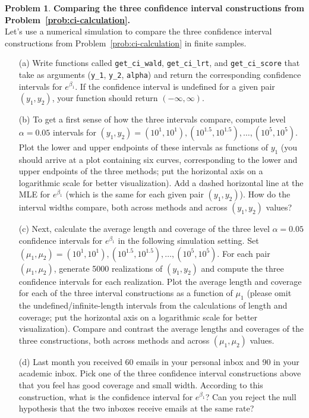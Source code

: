 \documentclass[11pt,letterpaper,english,oneside]{article} %
\theoremstyle{definition} %
\newtheorem{problem}{Problem}
\newenvironment{prob}{\clearpage \begin{problem}\hspace{0pt}}{\end{problem}}
\begin{document}
\begin{prob} \label{prob:ci-simulation}\textbf{Comparing the three confidence interval constructions from Problem~\ref{prob:ci-calculation}.} \\

    \noindent Let's use a numerical simulation to compare the three confidence interval constructions from Problem~\ref{prob:ci-calculation} in finite samples.
    
    \begin{enumerate}
    
    \item[(a)] Write functions called \verb|get_ci_wald|, \verb|get_ci_lrt|, and \verb|get_ci_score| that take as arguments (\verb|y_1|, \verb|y_2|, \verb|alpha|) and return the corresponding confidence intervals for $e^{\beta_1}$. If the confidence interval is undefined for a given pair $(y_1, y_2)$, your function should return $(-\infty, \infty)$.
    
    \item[(b)] To get a first sense of how the three intervals compare, compute level $\alpha = 0.05$ intervals for $(y_1, y_2) = (10^1, 10^1), (10^{1.5}, 10^{1.5}), \dots, (10^5, 10^5)$. Plot the lower and upper endpoints of these intervals as functions of $y_1$ (you should arrive at a plot containing six curves, corresponding to the lower and upper endpoints of the three methods; put the horizontal axis on a logarithmic scale for better visualization). Add a dashed horizontal line at the MLE for $e^{\beta_1}$ (which is the same for each given pair $(y_1, y_2)$). How do the interval widths compare, both across methods and across $(y_1, y_2)$ values?
    
    \item[(c)] Next, calculate the average length and coverage of the three level $\alpha = 0.05$ confidence intervals for $e^{\beta_1}$ in the following simulation setting. Set $(\mu_1, \mu_2) = (10^1, 10^1), (10^{1.5}, 10^{1.5}), \dots, (10^5, 10^5)$. For each pair $(\mu_1, \mu_2)$, generate 5000 realizations of $(y_1, y_2)$ and compute the three confidence intervals for each realization. Plot the average length and coverage for each of the three interval constructions as a function of $\mu_1$ (please omit the undefined/infinite-length intervals from the calculations of length and coverage; put the horizontal axis on a logarithmic scale for better visualization). Compare and contrast the average lengths and coverages of the three constructions, both across methods and across $(\mu_1, \mu_2)$ values.
    
    \item[(d)] Last month you received 60 emails in your personal inbox and 90 in your academic inbox. Pick one of the three confidence interval constructions above that you feel has good coverage and small width. According to this construction, what is the confidence interval for $e^{\beta_1}$? Can you reject the null hypothesis that the two inboxes receive emails at the same rate?
    \end{enumerate}
    
    
\end{prob}
\end{document}
